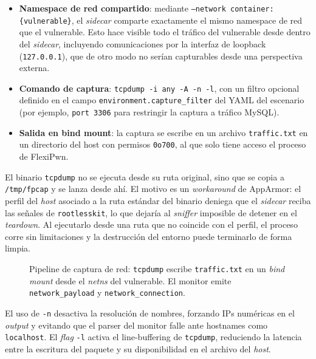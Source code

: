 \begin{itemize}
    \item \textbf{Namespace de red compartido}: mediante \texttt{--network
    container:\{vulnerable\}}, el \textit{sidecar} comparte exactamente el mismo
    namespace de red que el vulnerable. Esto hace visible todo el tráfico del
    vulnerable desde dentro del \textit{sidecar}, incluyendo comunicaciones por
    la interfaz de loopback (\texttt{127.0.0.1}), que de otro modo no serían
    capturables desde una perspectiva externa.

    \item \textbf{Comando de captura}: \texttt{tcpdump -i any -A -n -l}, con un
    filtro opcional definido en el campo \texttt{environment.capture\_filter}
    del YAML del escenario (por ejemplo, \texttt{port 3306} para restringir la
    captura a tráfico MySQL).

    \item \textbf{Salida en bind mount}: la captura se escribe en un archivo
    \texttt{traffic.txt} en un directorio del host con permisos \texttt{0o700},
    al que solo tiene acceso el proceso de FlexiPwn.
\end{itemize}

El binario \texttt{tcpdump} no se ejecuta desde su ruta original, sino que se
copia a \texttt{/tmp/fpcap} y se lanza desde ahí. El motivo es un
\textit{workaround} de AppArmor: el perfil del \textit{host} asociado a la ruta
estándar del binario deniega que el \textit{sidecar} reciba las señales de
\texttt{rootlesskit}, lo que dejaría al \textit{sniffer} imposible de detener en
el \textit{teardown}. Al ejecutarlo desde una ruta que no coincide con el
perfil, el proceso corre sin limitaciones y la destrucción del entorno puede
terminarlo de forma limpia.

\begin{figure}[H]
    \centering
    \resizebox{0.8\textwidth}{!}{}
    \caption[Pipeline de captura de red]{Pipeline de captura de red: \texttt{tcpdump}
    escribe \texttt{traffic.txt} en un \textit{bind mount} desde el
    \textit{netns} del vulnerable. El monitor emite
    \texttt{network\_payload} y \texttt{network\_connection}.}
    \label{fig:pipeline-red}
\end{figure}

El uso de \texttt{-n} desactiva la resolución de nombres, forzando IPs numéricas
en el \textit{output} y evitando que el parser del monitor falle ante hostnames
como \texttt{localhost}. El \textit{flag} \texttt{-l} activa el line-buffering
de \texttt{tcpdump}, reduciendo la latencia entre la escritura del paquete y su
disponibilidad en el archivo del \textit{host}.

